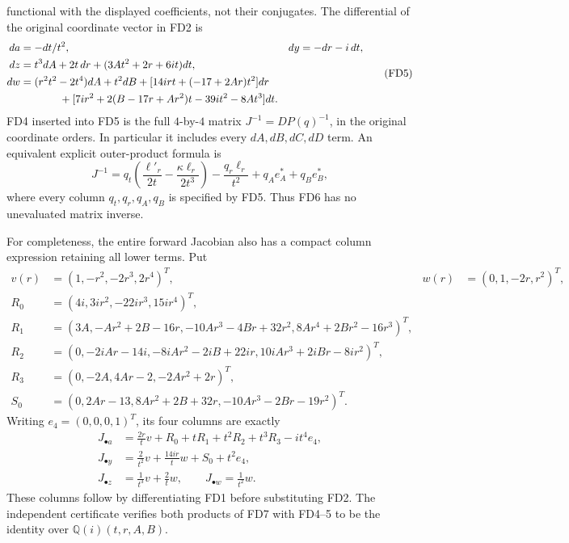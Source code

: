 \documentclass[11pt]{article}
\begin{document}
functional with the displayed coefficients, not their conjugates.
The differential of the original coordinate vector in FD2 is
\[
\begin{aligned}
 da&=-dt/t^2,&dy&=-dr-i\,dt,\\
 dz&=t^3dA+2t\,dr+(3At^2+2r+6it)dt,\\
 dw&=(r^2t^2-2t^4)dA+t^2dB
       +[14irt+(-17+2Ar)t^2]dr\\
   &\hspace{13mm}
       +[7ir^2+2(B-17r+Ar^2)t-39it^2-8At^3]dt.
\end{aligned}\tag{FD5}
\]
FD4 inserted into FD5 is the full \(4\)-by-\(4\) matrix
\(J^{-1}=DP(q)^{-1}\), in the original coordinate orders.
In particular it includes every \(dA,dB,dC,dD\) term.
An equivalent explicit outer-product formula is
\[
 J^{-1}=q_t\left(\frac{\ell'_r}{2t}
                    -\frac{\kappa\ell_r}{2t^3}\right)
          -\frac{q_r\ell_r}{t^2}+q_Ae_A^*+q_Be_B^*,
 \tag{FD6}
\]
where every column \(q_t,q_r,q_A,q_B\) is specified by FD5.
Thus FD6 has no unevaluated matrix inverse.

For completeness, the entire forward Jacobian also has a compact
column expression retaining all lower terms. Put
\[
\begin{aligned}
v(r)&=(1,-r^2,-2r^3,2r^4)^T,&
w(r)&=(0,1,-2r,r^2)^T,\\
R_0&=(4i,3ir^2,-22ir^3,15ir^4)^T,\\
R_1&=(3A,-Ar^2+2B-16r,
                  -10Ar^3-4Br+32r^2,8Ar^4+2Br^2-16r^3)^T,\\
R_2&=(0,-2iAr-14i,-8iAr^2-2iB+22ir,
                                10iAr^3+2iBr-8ir^2)^T,\\
R_3&=(0,-2A,4Ar-2,-2Ar^2+2r)^T,\\
S_0&=(0,2Ar-13,8Ar^2+2B+32r,
                              -10Ar^3-2Br-19r^2)^T.
\end{aligned}
\]
Writing \(e_4=(0,0,0,1)^T\), its four columns are exactly
\[
\begin{aligned}
J_{\bullet a}&=\frac{2r}{t}v+R_0+tR_1+t^2R_2+t^3R_3-it^4e_4,\\
J_{\bullet y}&=\frac2{t^2}v+\frac{14ir}{t}w+S_0+t^2e_4,\\
J_{\bullet z}&=\frac1{t^3}v+\frac2t w,\qquad
J_{\bullet w}=\frac1{t^2}w .
\end{aligned}\tag{FD7}
\]
These columns follow by differentiating FD1 before substituting
FD2. The independent certificate verifies both products of FD7
with FD4--5 to be the identity over
\(\mathbb Q(i)(t,r,A,B)\).
\end{document}
